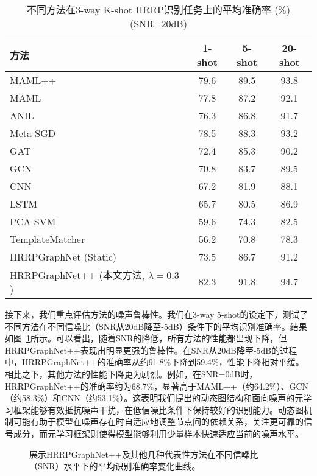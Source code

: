 \begin{table}[h!]
\centering
\caption{不同方法在3-way K-shot HRRP识别任务上的平均准确率 (\%) (SNR=20dB)}
\label{tab:fewshot_comparison_chap3}
\begin{tabular}{lccc}
\toprule
方法                  & 1-shot & 5-shot & 20-shot \\
\midrule
MAML++ \cite{Antoniou2018} & 79.6   & 89.5   & 93.8    \\
MAML \cite{Finn2017}       & 77.8   & 87.2   & 92.1    \\
ANIL \cite{raghu2020rapid} & 76.3   & 86.8   & 91.7    \\
Meta-SGD \cite{li2017meta} & 78.5   & 88.3   & 93.2    \\
GAT \cite{velickovic2018graph}  & 72.4   & 85.3   & 90.2    \\
GCN \cite{kipf2017semi}  & 70.8   & 83.7   & 89.5    \\
CNN \cite{Song2019}        & 67.2   & 81.9   & 88.1    \\
LSTM \cite{liu2021multi}       & 65.7   & 80.5   & 86.9    \\
PCA-SVM \cite{Liu2020}     & 59.6   & 74.3   & 82.5    \\
TemplateMatcher \cite{Cui2022} & 56.2   & 70.8   & 78.3    \\
\midrule
HRRPGraphNet \cite{Chen2024} (Static) & 73.5   & 86.7   & 91.2    \\
HRRPGraphNet++ (本文方法, $\lambda=0.3$) & 82.3   & 91.8   & 94.7    \\
\bottomrule
\end{tabular}
\end{table}

接下来，我们重点评估方法的噪声鲁棒性。我们在3-way 5-shot的设定下，测试了不同方法在不同信噪比（SNR从20dB降至-5dB）条件下的平均识别准确率。结果如图~\ref{fig:noise_robustness_chap3}所示。可以看出，随着SNR的降低，所有方法的性能都出现下降，但HRRPGraphNet++表现出明显更强的鲁棒性。在SNR从20dB降至-5dB的过程中，HRRPGraphNet++的准确率从约91.8\%下降到59.4\%，性能下降相对平缓。相比之下，其他方法的性能下降更为剧烈。例如，在SNR=0dB时，HRRPGraphNet++的准确率约为68.7\%，显著高于MAML++（约64.2\%）、GCN（约58.3\%）和CNN（约53.1\%）。这表明我们提出的动态图结构和面向噪声的元学习框架能够有效抵抗噪声干扰，在低信噪比条件下保持较好的识别能力。动态图机制可能有助于模型在噪声存在时自适应地调整节点间的依赖关系，关注更可靠的信号成分，而元学习框架则使得模型能够利用少量样本快速适应当前的噪声水平。

\begin{figure}[h!]
    \centering
    \caption{展示HRRPGraphNet++及其他几种代表性方法在不同信噪比（SNR）水平下的平均识别准确率变化曲线。}
    \label{fig:noise_robustness_chap3}
\end{figure}

